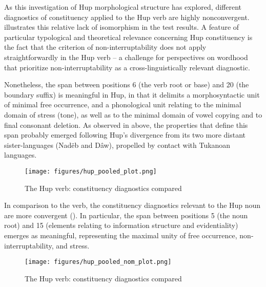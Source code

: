 \documentclass[output=paper]{langscibook}
\begin{document}
As this investigation of Hup morphological structure has explored, different diagnostics of constituency applied to the Hup verb are highly nonconvergent.  illustrates this relative lack of isomorphism in the test results. A feature of particular typological and theoretical relevance concerning Hup constituency is the fact that the criterion of non-interruptability does not apply straightforwardly in the Hup verb – a challenge for perspectives on wordhood that prioritize non-interruptability as a cross-linguistically relevant diagnostic.

Nonetheless, the span between positions 6 (the verb root or base) and 20 (the boundary suffix) is meaningful in Hup, in that it delimits a morphosyntactic unit of minimal free occurrence, and a phonological unit relating to the minimal domain of stress (tone), as well as to the minimal domain of vowel copying and to final consonant deletion. As observed in  above, the properties that define this span probably emerged following Hup's divergence from its two more distant sister-languages (Nadëb and Dâw), propelled by contact with Tukanoan languages. 



\begin{figure}
    \centering
    \texttt{[image: figures/hup\_pooled\_plot.png]}
    \caption{The Hup verb: constituency diagnostics compared}
    \label{fig:key:4}
\end{figure} 


In comparison to the verb, the constituency diagnostics relevant to the Hup noun are more convergent (). In particular, the span between positions 5 (the noun root) and 15 (elements relating to information structure and evidentiality) emerges as meaningful, representing the maximal unity of free occurrence, non-interruptability, and stress.

\begin{figure}
    \centering
    \texttt{[image: figures/hup\_pooled\_nom\_plot.png]}
    \caption{The Hup verb: constituency diagnostics compared}
    \label{fig:key:5}
\end{figure} 
\end{document}
